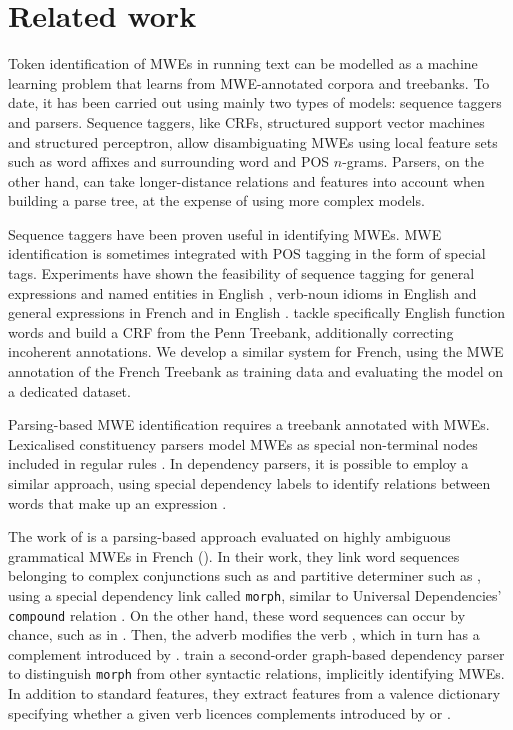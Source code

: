 \documentclass[output=paper,
modfonts
]{langscibook}
\begin{document}
\section{Related work}
\label{schol:sec:relwork}

Token identification of MWEs in running text can be modelled as a machine learning problem that learns from MWE-annotated corpora and treebanks.
To date, it has been carried out using mainly two types of models: sequence taggers and parsers. Sequence taggers, like CRFs, structured support vector machines and structured perceptron, allow disambiguating MWEs using local feature sets such as word affixes and surrounding word and POS $n$-grams. Parsers, on the other hand, can take longer-distance relations and features into account when building a parse tree, at the expense of using more complex models. 

Sequence taggers have been proven useful in identifying MWEs. MWE identification is sometimes integrated with POS tagging in the form of special tags. Experiments have shown the feasibility of sequence tagging for general expressions and named entities in English \citep{vincze-nagyt-berend:2011:MWE}, verb-noun idioms in English \citep{diab-bhutada:2009:MWE09} and general expressions in French \citep{constant-sigogne:2011:MWE}
and in English \citep{Schneider14b,riedl-biemann:2016:MWE}. \citet{shigeto-EtAl:2013:MWE}  tackle specifically English function words and build a CRF from the Penn Treebank, additionally correcting incoherent annotations. We develop a similar system for French, using the MWE annotation of the French Treebank as training data and evaluating the model on a dedicated dataset.

Parsing-based MWE identification requires a treebank annotated with MWEs. Lexicalised constituency parsers model MWEs as special non-terminal nodes included in regular rules \citep{Green:2013:PMI:2464100.2464109}. In dependency parsers, it is possible to employ a similar approach, using special dependency labels to identify relations between words that make up an expression \citep{candito-constant:acl:2014}. 

The work of \citet{nasr:acl:2015} is a parsing-based approach evaluated on highly ambiguous grammatical MWEs in French (). In their work, they link word sequences belonging to complex conjunctions such as  and partitive determiner such as , using a special dependency link called \texttt{morph}, similar to Universal Dependencies' \texttt{compound} relation \citep{univdep}. On the other hand, these word sequences can occur by chance, such as in . Then, the adverb  modifies the verb , which in turn has a complement introduced by . \citet{nasr:acl:2015} train a second-order graph-based dependency parser to distinguish \texttt{morph} from other syntactic relations, implicitly identifying MWEs. In addition to standard features, they extract features from a valence dictionary specifying whether a given verb licences complements introduced by  or .
\end{document}
